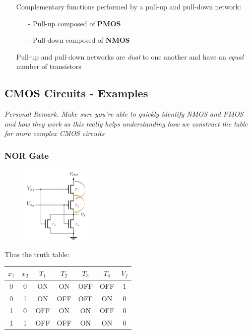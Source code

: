 \documentclass[12pt,openany]{book}
\begin{document}
			      	\begin{itemize}
			      		\item[] Complementary functions performed by a pull-up and pull-down network:
			      		      \begin{itemize}
			      		      	\item[-] Pull-up composed of \textbf{PMOS}
			      		      	\item[-] Pull-down composed of \textbf{NMOS}
			      		      \end{itemize}
			      		\item[] Pull-up and pull-down networks are \textit{dual} to one another and have an \textit{equal} number of transistors
			      	\end{itemize}
			      	
			      	\subsection{CMOS Circuits - Examples}
			      	\textit{Personal Remark. Make sure you're able to quickly identify NMOS and PMOS and how they work as this really helps understanding how we construct the table for more complex CMOS circuits}
			      	\subsubsection{NOR Gate}
			      	\begin{figure}[h]
			      		\centering
			      		\includegraphics[width=0.3\textwidth]{circuits/9.1.5.png} %
			      	\end{figure}
			      	Thus the truth table: 
			      	\begin{center}
			      		\begin{tabular}{ |c|c||c|c|c|c||c| }
			      			\hline
			      			\( x_1 \) & \( x_2 \) & \( T_1 \) & \( T_2 \) & \( T_3 \) & \( T_4 \) & \( V_f \) \\
			      			\hline
			      			0         & 0         & ON        & ON        & OFF       & OFF       & 1         \\
			      			0         & 1         & ON        & OFF       & OFF       & ON        & 0         \\
			      			1         & 0         & OFF       & ON        & ON        & OFF       & 0         \\
			      			1         & 1         & OFF       & OFF       & ON        & ON        & 0         \\
			      			\hline
			      		\end{tabular}
			      	\end{center}
			      	
\end{document}
